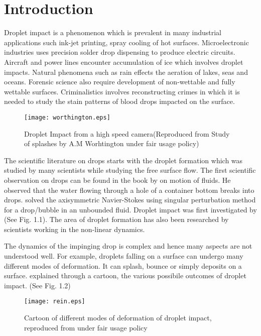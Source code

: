 
\chapter{Introduction}
Droplet impact is a phenomenon which is prevalent in many industrial applications such ink-jet printing, 
spray cooling of hot surfaces. Microelectronic industries uses precision solder drop dispensing to produce
electric circuits. Aircraft and power lines encounter accumulation of ice which involves droplet impacts.
Natural phenomena such as rain effects the aeration of lakes, seas and oceans. 
Forensic science also require development of non-wettable and fully wettable surfaces. Criminalistics involves
reconstructing crimes in which it is needed to study the stain patterns of blood drops impacted on the
surface.

\begin{figure}[tbp]
 \texttt{[image: worthington.eps]}
 \caption[Droplet impact graphic by Worthington]{Droplet Impact from a high speed camera(Reproduced from Study of splashes by A.M Worhtington under fair usage policy)}
\end{figure}


The scientific literature on drops starts with the droplet formation which was studied by many scientists while studying the
free surface flow. The first scientific observation on drops can be found in the book by \cite{Mariotte1700} on motion of  
fluids. He observed that the water flowing through a hole of a container bottom breaks into drops. \cite{Taylor1963} solved the  axisymmetric Navier-Stokes  using
singular perturbation method for a drop/bubble in an unbounded fluid. Droplet impact was first investigated by \cite{Worthington1908} (See Fig. 1.1).
The area of droplet formation has also been researched by scientists working in the non-linear dynamics.

The dynamics of the impinging drop is complex and hence many aspects are not understood well. For example, droplets falling
on a surface can undergo many different modes of deformation. It can splash, bounce or simply deposits on a surface. \cite{Rein2002} 
explained through a cartoon, the various possibile outcomes of droplet impact. (See Fig. 1.2)

\begin{figure}[tbp]
 \texttt{[image: rein.eps]}
 \caption[Different modes of deformation of droplet impact]{Cartoon of different modes of deformation of droplet impact, reproduced from \cite{Rein2002} under fair usage policy}
\end{figure}
